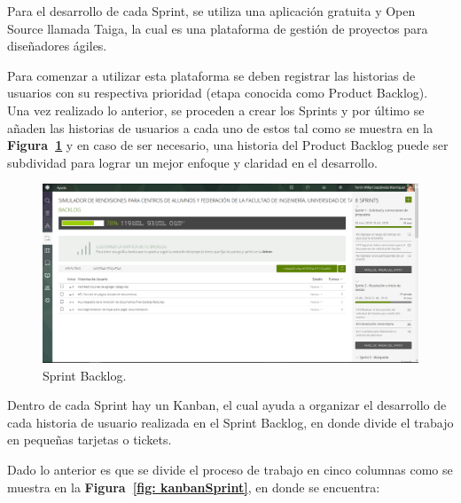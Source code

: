 Para el desarrollo de cada Sprint, se utiliza una aplicación gratuita y Open Source llamada Taiga, la cual es una plataforma de gestión de proyectos para diseñadores ágiles.

Para comenzar a utilizar esta plataforma se deben registrar las historias de usuarios con su respectiva prioridad (etapa conocida como Product Backlog). Una vez realizado lo anterior, se proceden a crear los Sprints y por último se añaden las historias de usuarios a cada uno de estos tal como se muestra en la \textbf{Figura~\ref{fig: SprintBacklog}} y en caso de ser necesario, una historia del Product Backlog puede ser subdividad para lograr un mejor enfoque y claridad en el desarrollo.

\begin{figure}[h!]
    \includegraphics[width=\textwidth]{Imagenes/SprintBacklog.png}
    \caption{\label{fig: SprintBacklog} Sprint Backlog.}
\end{figure}

Dentro de cada Sprint hay un Kanban, el cual ayuda a organizar el desarrollo de cada historia de usuario realizada en el Sprint Backlog, en donde divide el trabajo en pequeñas tarjetas o tickets.

Dado lo anterior es que se divide el proceso de trabajo en cinco columnas como se muestra en la \textbf{Figura~\ref{fig: kanbanSprint}}, en donde se encuentra:


